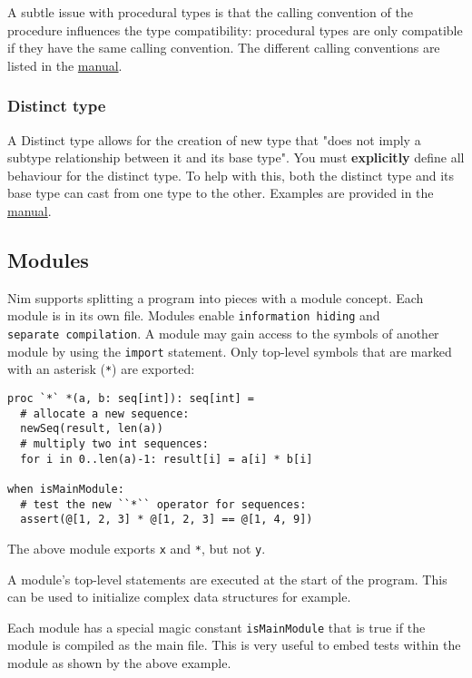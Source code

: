 A subtle issue with procedural types is that the calling convention of
the procedure influences the type compatibility: procedural types are
only compatible if they have the same calling convention. The different
calling conventions are listed in the
\href{manual.html\#types-procedural-type}{manual}.

\hypertarget{distinct-type}{%
\subsubsection{Distinct type}\label{distinct-type}}

A Distinct type allows for the creation of new type that "does not imply
a subtype relationship between it and its base type". You must
\textbf{explicitly} define all behaviour for the distinct type. To help
with this, both the distinct type and its base type can cast from one
type to the other. Examples are provided in the
\href{manual.html\#types-distinct-type}{manual}.

\hypertarget{modules}{%
\subsection{Modules}\label{modules}}

Nim supports splitting a program into pieces with a module concept. Each
module is in its own file. Modules enable \texttt{information\ hiding}
and \texttt{separate\ compilation}. A module may gain access to the
symbols of another module by using the \texttt{import} statement. Only
top-level symbols that are marked with an asterisk (\texttt{*}) are
exported:

\begin{verbatim}
proc `*` *(a, b: seq[int]): seq[int] =
  # allocate a new sequence:
  newSeq(result, len(a))
  # multiply two int sequences:
  for i in 0..len(a)-1: result[i] = a[i] * b[i]

when isMainModule:
  # test the new ``*`` operator for sequences:
  assert(@[1, 2, 3] * @[1, 2, 3] == @[1, 4, 9])
\end{verbatim}

The above module exports \texttt{x} and \texttt{*}, but not \texttt{y}.

A module's top-level statements are executed at the start of the
program. This can be used to initialize complex data structures for
example.

Each module has a special magic constant \texttt{isMainModule} that is
true if the module is compiled as the main file. This is very useful to
embed tests within the module as shown by the above example.

